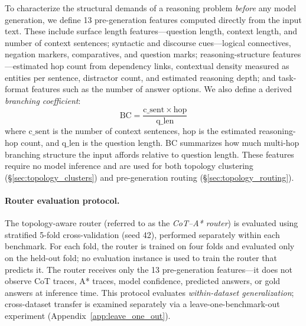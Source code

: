 \documentclass[11pt]{article}
\begin{document}


To characterize the structural demands of a reasoning problem \emph{before} any model generation, we define 13 pre-generation features computed directly from the input text. These include surface length features---question length, context length, and number of context sentences; syntactic and discourse cues---logical connectives, negation markers, comparatives, and question marks; reasoning-structure features---estimated hop count from dependency links, contextual density measured as entities per sentence, distractor count, and estimated reasoning depth; and task-format features such as the number of answer options. We also define a derived \emph{branching coefficient}:
\begin{equation}
\mathrm{BC} = \frac{\mathrm{c\_sent} \times \mathrm{hop}}{\mathrm{q\_len}}
\label{eq:branching_coefficient}
\end{equation}
where $\mathrm{c\_sent}$ is the number of context sentences, $\mathrm{hop}$ is the estimated reasoning-hop count, and $\mathrm{q\_len}$ is the question length. BC summarizes how much multi-hop branching structure the input affords relative to question length.
These features require no model inference and are used for both topology clustering (\S\ref{sec:topology_clusters}) and pre-generation routing (\S\ref{sec:topology_routing}).

\paragraph{Router evaluation protocol.} The topology-aware router (referred to as the \emph{CoT--A* router}) is evaluated using stratified 5-fold cross-validation (seed 42), performed separately within each benchmark. For each fold, the router is trained on four folds and evaluated only on the held-out fold; no evaluation instance is used to train the router that predicts it. The router receives only the 13 pre-generation features---it does not observe CoT traces, A* traces, model confidence, predicted answers, or gold answers at inference time. This protocol evaluates \emph{within-dataset generalization}; cross-dataset transfer is examined separately via a leave-one-benchmark-out experiment (Appendix~\ref{app:leave_one_out}).
\end{document}
